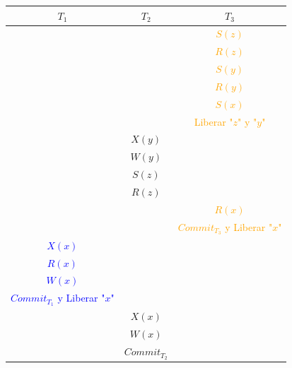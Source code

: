 \documentclass{templateNote}
\begin{document}
\begin{enumerate}
    \begin{center}
        \begin{tabular}{|c|c|c|}
            \hline
            \textbf{$T_1$} & \textbf{$T_2$} & \textbf{$T_3$} \\ \hline
            & & \textcolor{orange}{$S(z)$} \\
            & & \textcolor{orange}{$R(z)$} \\
            & & \textcolor{orange}{$S(y)$} \\
            & & \textcolor{orange}{$R(y)$} \\
            & & \textcolor{orange}{$S(x)$} \\
            & & \textcolor{orange}{Liberar "$z$" y "$y$"} \\
            & \textcolor{green!80!black}{$X(y)$} & \\
            & \textcolor{green!80!black}{$W(y)$} & \\
            & \textcolor{green!80!black}{$S(z)$} & \\
            & \textcolor{green!80!black}{$R(z)$} & \\
            & & \textcolor{orange}{$R(x)$} \\
            & & \textcolor{orange}{$Commit_{T_3}$ y Liberar "$x$"} \\
            \textcolor{blue}{$X(x)$} & & \\
            \textcolor{blue}{$R(x)$} & & \\
            \textcolor{blue}{$W(x)$} & & \\
            \textcolor{blue}{$Commit_{T_{1}}$ y Liberar "$x$"} & & \\
            & \textcolor{green!80!black}{$X(x)$} & \\
            & \textcolor{green!80!black}{$W(x)$} & \\
            & \textcolor{green!80!black}{$Commit_{T_{2}}$} & \\ \hline
        \end{tabular}
    \end{center}


\end{enumerate}
\end{document}
